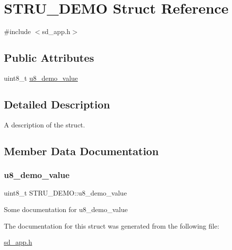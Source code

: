 \hypertarget{struct_s_t_r_u___d_e_m_o}{}\section{S\+T\+R\+U\+\_\+\+D\+E\+MO Struct Reference}
\label{struct_s_t_r_u___d_e_m_o}


{\ttfamily \#include $<$sd\+\_\+app.\+h$>$}

\subsection*{Public Attributes}
\begin{DoxyCompactItemize}
\item 
uint8\+\_\+t \hyperlink{struct_s_t_r_u___d_e_m_o_a79ae9788d6fe743339242fc3369a482e}{u8\+\_\+demo\+\_\+value}
\end{DoxyCompactItemize}


\subsection{Detailed Description}
A description of the struct. 

\subsection{Member Data Documentation}
\mbox{\label{struct_s_t_r_u___d_e_m_o_a79ae9788d6fe743339242fc3369a482e}} 
\subsubsection{\texorpdfstring{u8\+\_\+demo\+\_\+value}{u8\_demo\_value}}
{\footnotesize\ttfamily uint8\+\_\+t S\+T\+R\+U\+\_\+\+D\+E\+M\+O\+::u8\+\_\+demo\+\_\+value}

Some documentation for u8\+\_\+demo\+\_\+value 

The documentation for this struct was generated from the following file\+:\begin{DoxyCompactItemize}
\item 
\hyperlink{sd__app_8h}{sd\+\_\+app.\+h}\end{DoxyCompactItemize}
